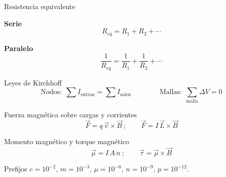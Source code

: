 \documentclass[addpoints,12pt]{exam}
\begin{document}
\begin{formbox}{Resistencia equivalente}
\noindent
\begin{minipage}[t]{0.48\textwidth}
\centering\textbf{Serie}
\[
    R_{eq}=R_1+R_2+\cdots
\]
\end{minipage}%
\hfill
\begin{minipage}[t]{0.48\textwidth}
\centering\textbf{Paralelo}
\[
    \frac{1}{R_{eq}}=\frac{1}{R_1}+\frac{1}{R_2}+\cdots
\]
\end{minipage}
\end{formbox}

\begin{formbox}{Leyes de Kirchhoff}
\[
    \text{Nodos:}\ \ \sum I_{\text{entran}}=\sum I_{\text{salen}}
    \qquad\qquad
    \text{Mallas:}\ \ \sum_{\text{malla}}\Delta V=0
\]
\end{formbox}

\begin{formbox}{Fuerza magn\'etica sobre cargas y corrientes}
\[
    \vec{F}=q\,\vec{v}\times\vec{B}\ ;\qquad \vec{F}=I\,\vec{L}\times\vec{B}
\]
\end{formbox}

\begin{formbox}{Momento magn\'etico y torque magn\'etico}
\[
    \vec{\mu}=I\,A\,\hat{n}\ ;\qquad \vec{\tau}=\vec{\mu}\times\vec{B}
\]
\end{formbox}

\begin{formbox}{Prefijos}
$c=10^{-2}$, \quad $m=10^{-3}$, \quad $\mu=10^{-6}$, \quad $n=10^{-9}$, \quad $p=10^{-12}$.
\end{formbox}
\end{document}
